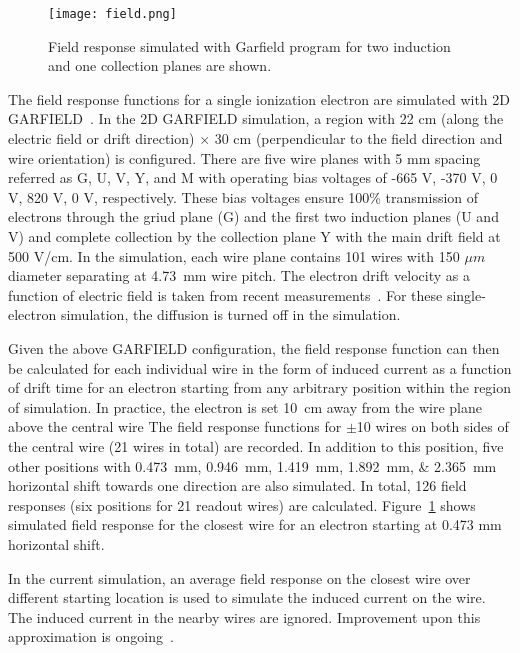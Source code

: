 \begin{figure}[!htp]
\texttt{[image: field.png]}
\caption[field-resp]{Field response simulated with Garfield program 
for two induction and one collection planes are shown.}
\label{field_resp}
\end{figure}

The field response functions for a single ionization electron are simulated with 2D GARFIELD~\cite{garfield}.
In the 2D GARFIELD simulation, a region with 22 cm (along the electric field or drift direction) $\times$ 30 cm (perpendicular to the field direction and wire orientation) is configured. There are five wire planes
with 5 mm spacing referred as G, U, V, Y, and M with operating bias voltages of -665 V, -370 V, 0 V, 820 V, 0 V, respectively.  These bias voltages ensure 100\% transmission of electrons through the griud plane (G) and the first two induction planes (U and V) and complete collection by the collection plane Y with the main drift field at 500 V/cm. 
  In the simulation, each wire plane contains 101 wires with 150 $\mu m$ diameter
  separating at \SI{4.73}{\mm} wire pitch. The electron drift velocity as a function of electric
  field is taken from recent measurements~\cite{Li:2015rqa,ref:lar_property}. For these
  single-electron simulation, the diffusion is turned off in the simulation. 

 Given the above GARFIELD configuration, the field response function can then be calculated
  for each individual wire in the form of induced current as a function of drift time for an
  electron starting from any arbitrary position within the region of simulation. 
  In practice, the electron is set \SI{10}{\cm} away from the wire plane above the central wire 
  The field response functions
  for $\pm$10 wires on both sides of the central wire (21 wires in total) are recorded.
  In addition to this position, five other positions with
  \SIlist{0.473;0.946;1.419;1.892;2.365}{\mm} horizontal shift towards one direction are also simulated.
  In total, 126 field responses (six positions for 21 readout wires) are calculated.
  Figure~\ref{field_resp} shows simulated field response for the closest wire for an electron starting at 
  0.473 mm horizontal shift. 
  
  In the current simulation, an average field response on the closest wire over different starting location is
  used to simulate the induced current on the wire. The induced current in the nearby wires are ignored. 
  Improvement upon this approximation is ongoing~\cite{ref:full_simulation}. 


